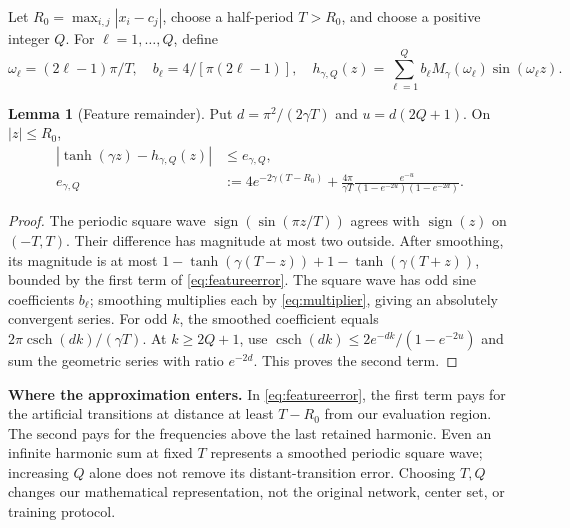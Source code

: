 \documentclass[11pt]{article}
\DeclareMathOperator{\csch}{csch}
\DeclareMathOperator{\sign}{sign}
\theoremstyle{definition}
\newtheorem{lemma}{Lemma}
\begin{document}
Let $R_0=\max_{i,j}|x_i-c_j|$, choose a half-period $T>R_0$, and choose a
positive integer $Q$. For $\ell=1,\ldots,Q$, define
\begin{equation*}
 \omega_\ell=(2\ell-1)\pi/T,\quad b_\ell=4/[\pi(2\ell-1)],\quad
 h_{\gamma,Q}(z)=\sum_{\ell=1}^Q b_\ell M_\gamma(\omega_\ell)\sin(\omega_\ell z).
\end{equation*}
\begin{lemma}[Feature remainder]
Put $d=\pi^2/(2\gamma T)$ and $u=d(2Q+1)$. On $|z|\le R_0$,
\begin{equation}\label{eq:featureerror}
 \begin{split}
 |\tanh(\gamma z)-h_{\gamma,Q}(z)|&\le e_{\gamma,Q},\\
 e_{\gamma,Q}&:=4e^{-2\gamma(T-R_0)}+
 \frac{4\pi}{\gamma T}\frac{e^{-u}}{(1-e^{-2u})(1-e^{-2d})}.
 \end{split}
\end{equation}
\end{lemma}
\begin{proof}
The periodic square wave $\sign(\sin(\pi z/T))$ agrees with $\sign(z)$ on
$(-T,T)$. Their difference has magnitude at most two outside. After
smoothing, its magnitude is at most
$1-\tanh(\gamma(T-z))+1-\tanh(\gamma(T+z))$, bounded by the first term of
\eqref{eq:featureerror}. The square wave has odd sine coefficients $b_\ell$;
smoothing multiplies each by \eqref{eq:multiplier}, giving an absolutely
convergent series. For odd $k$, the smoothed coefficient equals
$2\pi\csch(dk)/(\gamma T)$. At $k\ge2Q+1$, use
$\csch(dk)\le2e^{-dk}/(1-e^{-2u})$ and sum the geometric series with ratio
$e^{-2d}$. This proves the second term.
\end{proof}
\textbf{Where the approximation enters.} In \eqref{eq:featureerror}, the first
term pays for the artificial transitions at distance at least $T-R_0$ from our
evaluation region. The second pays for the frequencies above the last retained
harmonic. Even an infinite harmonic sum at fixed $T$ represents a smoothed
periodic square wave; increasing $Q$ alone does not remove its distant-transition
error. Choosing $T,Q$ changes our mathematical representation, not the original
network, center set, or training protocol.
\end{document}
